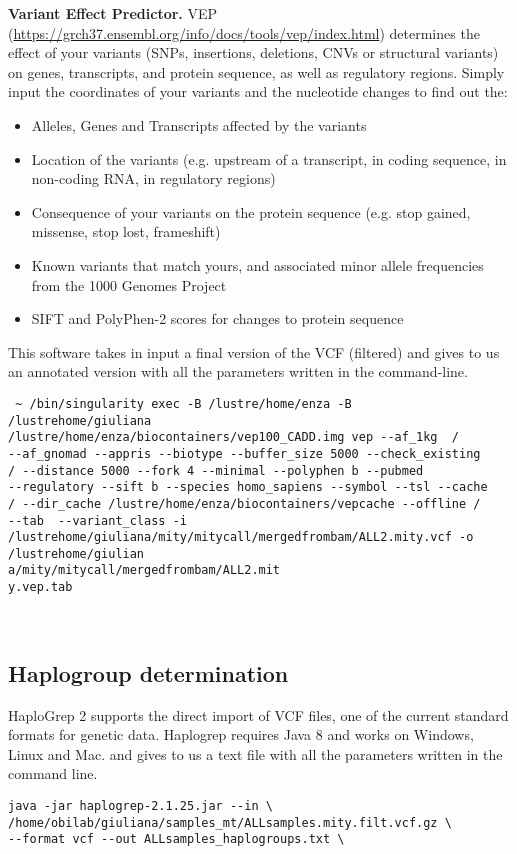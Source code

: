 \textbf{Variant Effect Predictor.}  VEP (\url{https://grch37.ensembl.org/info/docs/tools/vep/index.html}) determines the effect of your variants (SNPs, insertions, deletions, CNVs or structural variants) on genes, transcripts, and protein sequence, as well as regulatory regions.
Simply input the coordinates of your variants and the nucleotide changes to find out the:
\begin{itemize}
    \item Alleles, Genes and Transcripts affected by the variants
    \item Location of the variants (e.g. upstream of a transcript, in coding sequence, in non-coding RNA, in regulatory regions)
    \item Consequence of your variants on the protein sequence (e.g. stop gained, missense, stop lost, frameshift)
    \item Known variants that match yours, and associated minor allele frequencies from the 1000 Genomes Project
    \item  SIFT and PolyPhen-2 scores for changes to protein sequence
\end{itemize}
\newline
This software takes in input a final version of the VCF (filtered) and gives to us an annotated version with all the parameters written in the command-line. \newline

\begin{verbatim} ~ /bin/singularity exec -B /lustre/home/enza -B   /lustrehome/giuliana
/lustre/home/enza/biocontainers/vep100_CADD.img vep --af_1kg  /
--af_gnomad --appris --biotype --buffer_size 5000 --check_existing
/ --distance 5000 --fork 4 --minimal --polyphen b --pubmed
--regulatory --sift b --species homo_sapiens --symbol --tsl --cache
/ --dir_cache /lustre/home/enza/biocontainers/vepcache --offline /
--tab  --variant_class -i
/lustrehome/giuliana/mity/mitycall/mergedfrombam/ALL2.mity.vcf -o /lustrehome/giulian
a/mity/mitycall/mergedfrombam/ALL2.mit
y.vep.tab 

\end{verbatim}\\


\subsection{Haplogroup determination}
HaploGrep 2 supports the direct import of VCF files, one of the current standard formats for genetic data.
Haplogrep requires Java 8 and works on Windows, Linux and Mac. and gives to us a text file with all the parameters written in the command line. \newline

\begin{verbatim} 
java -jar haplogrep-2.1.25.jar --in \
/home/obilab/giuliana/samples_mt/ALLsamples.mity.filt.vcf.gz \
--format vcf --out ALLsamples_haplogroups.txt \ \end{verbatim}
\\
\textbf{}

